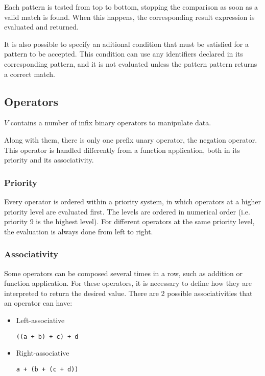 \documentclass{article}
\def\code#1{\begin{footnotesize}\texttt{#1}\end{footnotesize}}
\begin{document}
Each pattern is tested from top to bottom, stopping the comparison as soon as a valid match is found.
When this happens, the corresponding result expression is evaluated and returned.

It is also possible to specify an aditional condition that must be satisfied for a pattern to be accepted.
This condition can use any identifiers declared in its corresponding pattern, and it is not evaluated unless the pattern pattern returns a correct match.

\subsection{Operators}

$V$ contains a number of infix binary operators to manipulate data.

Along with them, there is only one prefix unary operator, the negation operator.
This operator is handled differently from a function application, both in its priority and its associativity.

\subsubsection{Priority}

Every operator is ordered within a priority system, in which operators at a higher priority level are evaluated first.
The levels are ordered in numerical order (i.e. priority 9 is the highest level).
For different operators at the same priority level, the evaluation is always done from left to right.

\subsubsection{Associativity}

Some operators can be composed several times in a row, such as addition or function application.
For these operators, it is necessary to define how they are interpreted to return the desired value.
There are 2 possible associativities that an operator can have:

\begin{itemize}
  \item Left-associative \\
    \code{((a + b) + c) + d}
  \item Right-associative \\
    \code{a + (b + (c + d))}
\end{itemize}
\end{document}
